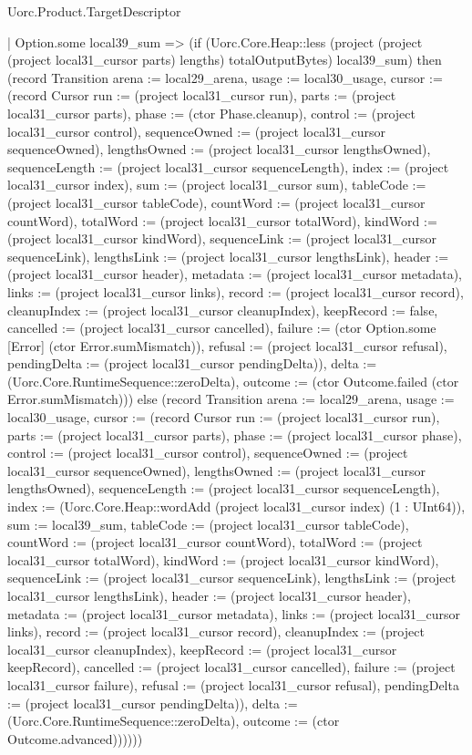 \begin{lexlean}{Uorc.Product.TargetDescriptor}
\begin{semanticmodule}
{        | Option.some local39_sum => (if (Uorc.Core.Heap::less (project (project (project local31_cursor parts) lengths) totalOutputBytes) local39_sum) then (record Transition {arena := local29_arena, usage := local30_usage, cursor := (record Cursor {run := (project local31_cursor run), parts := (project local31_cursor parts), phase := (ctor Phase.cleanup), control := (project local31_cursor control), sequenceOwned := (project local31_cursor sequenceOwned), lengthsOwned := (project local31_cursor lengthsOwned), sequenceLength := (project local31_cursor sequenceLength), index := (project local31_cursor index), sum := (project local31_cursor sum), tableCode := (project local31_cursor tableCode), countWord := (project local31_cursor countWord), totalWord := (project local31_cursor totalWord), kindWord := (project local31_cursor kindWord), sequenceLink := (project local31_cursor sequenceLink), lengthsLink := (project local31_cursor lengthsLink), header := (project local31_cursor header), metadata := (project local31_cursor metadata), links := (project local31_cursor links), record := (project local31_cursor record), cleanupIndex := (project local31_cursor cleanupIndex), keepRecord := false, cancelled := (project local31_cursor cancelled), failure := (ctor Option.some [Error] (ctor Error.sumMismatch)), refusal := (project local31_cursor refusal), pendingDelta := (project local31_cursor pendingDelta)}), delta := (Uorc.Core.RuntimeSequence::zeroDelta), outcome := (ctor Outcome.failed (ctor Error.sumMismatch))}) else (record Transition {arena := local29_arena, usage := local30_usage, cursor := (record Cursor {run := (project local31_cursor run), parts := (project local31_cursor parts), phase := (project local31_cursor phase), control := (project local31_cursor control), sequenceOwned := (project local31_cursor sequenceOwned), lengthsOwned := (project local31_cursor lengthsOwned), sequenceLength := (project local31_cursor sequenceLength), index := (Uorc.Core.Heap::wordAdd (project local31_cursor index) (1 : UInt64)), sum := local39_sum, tableCode := (project local31_cursor tableCode), countWord := (project local31_cursor countWord), totalWord := (project local31_cursor totalWord), kindWord := (project local31_cursor kindWord), sequenceLink := (project local31_cursor sequenceLink), lengthsLink := (project local31_cursor lengthsLink), header := (project local31_cursor header), metadata := (project local31_cursor metadata), links := (project local31_cursor links), record := (project local31_cursor record), cleanupIndex := (project local31_cursor cleanupIndex), keepRecord := (project local31_cursor keepRecord), cancelled := (project local31_cursor cancelled), failure := (project local31_cursor failure), refusal := (project local31_cursor refusal), pendingDelta := (project local31_cursor pendingDelta)}), delta := (Uorc.Core.RuntimeSequence::zeroDelta), outcome := (ctor Outcome.advanced)})))))
}
\end{semanticmodule}
\end{lexlean}
